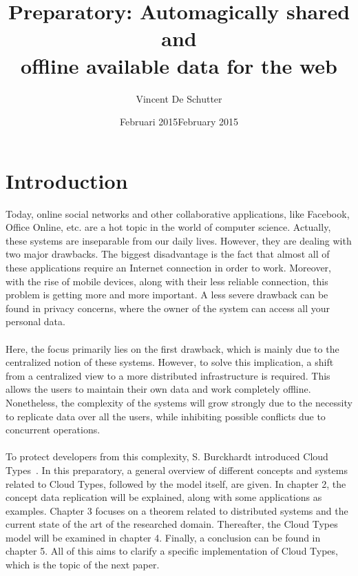 \documentclass[a4paper,12pt]{report}
\author{Vincent De Schutter}
\title{Preparatory: Automagically shared and \\offline available data for the web}
\date{Februari 2015}
\begin{document}


\date{February 2015}

\maketitlepage


\tableofcontents
\newpage

\chapter{Introduction}\label{cha:Introduction} %
\vspace*{-1cm}

Today, online social networks and other collaborative applications, like Facebook, Office Online, etc. are a hot topic in the world of computer science. Actually, these systems are inseparable from our daily lives. However, they are dealing with two major drawbacks. The biggest disadvantage is the fact that almost all of these applications require an Internet connection in order to work. Moreover, with the rise of mobile devices, along with their less reliable connection, this problem is getting more and more important. A less severe drawback can be found in privacy concerns, where the owner of the system can access all your personal data. \\
\\
Here, the focus primarily lies on the first drawback, which is mainly due to the centralized notion of these systems. However, to solve this implication, a shift from a centralized view to a more distributed infrastructure is required. This allows the users to maintain their own data and work completely offline. Nonetheless, the complexity of the systems will grow strongly due to the necessity to replicate data over all the users, while inhibiting possible conflicts due to concurrent operations. \\
\\
To protect developers from this complexity, S. Burckhardt introduced Cloud Types~\cite{Burckhardt}. In this preparatory, a general overview of different concepts and systems related to Cloud Types, followed by the model itself, are given. In chapter 2, the concept data replication will be explained, along with some applications as examples. Chapter 3 focuses on a theorem related to distributed systems and the current state of the art of the researched domain. Thereafter, the Cloud Types model will be examined in chapter 4. Finally, a conclusion can be found in chapter 5.
All of this aims to clarify a specific implementation of Cloud Types, which is the topic of the next paper.
\end{document}
